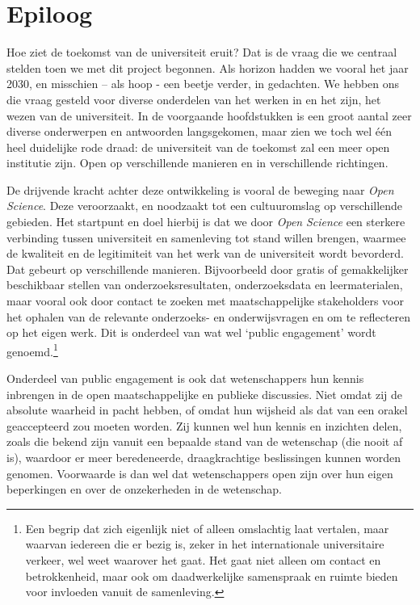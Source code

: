 \documentclass[smallauthor, chapterhaspagenum, nochapterinheader, pagenuminheader,  bigchapnum,medium2, tocpages, garamond, titleinheader]{jote-book}
\begin{document}
	\chapter*{Epiloog}

	\nochapterinheader



	Hoe ziet de toekomst van de universiteit eruit? Dat is de vraag die we centraal stelden toen we met dit project begonnen. Als horizon hadden we vooral het jaar 2030, en misschien -- als hoop - een beetje verder, in gedachten. We hebben ons die vraag gesteld voor diverse onderdelen van het werken in en het zijn, het wezen van de universiteit. In de voorgaande hoofdstukken is een groot aantal zeer diverse onderwerpen en antwoorden langsgekomen, maar zien we toch wel één heel duidelijke rode draad: de universiteit van de toekomst zal een meer open institutie zijn. Open op verschillende manieren en in verschillende richtingen.



	De drijvende kracht achter deze ontwikkeling is vooral de beweging naar \emph{Open }\emph{Science}. Deze veroorzaakt, en noodzaakt tot een cultuuromslag op verschillende gebieden. Het startpunt en doel hierbij is dat we door \emph{Open }\emph{Science} een sterkere verbinding tussen universiteit en samenleving tot stand willen brengen, waarmee de kwaliteit en de legitimiteit van het werk van de universiteit wordt bevorderd. Dat gebeurt op verschillende manieren. Bijvoorbeeld door gratis of gemakkelijker beschikbaar stellen van onderzoeksresultaten, onderzoeksdata en leermaterialen, maar vooral ook door contact te zoeken met maatschappelijke stakeholders voor het ophalen van de relevante onderzoeks- en onderwijsvragen en om te reflecteren op het eigen werk. Dit is onderdeel van wat wel ‘public engagement' wordt genoemd.\footnote{Een begrip dat zich eigenlijk niet of alleen omslachtig laat vertalen, maar waarvan iedereen die er bezig is, zeker in het internationale universitaire verkeer, wel weet waarover het gaat. Het gaat niet alleen om contact en betrokkenheid, maar ook om daadwerkelijke samenspraak en ruimte bieden voor invloeden vanuit de samenleving.}



	Onderdeel van public engagement is ook dat wetenschappers hun kennis inbrengen in de open maatschappelijke en publieke discussies. Niet omdat zij de absolute waarheid in pacht hebben, of omdat hun wijsheid als dat van een orakel geaccepteerd zou moeten worden. Zij kunnen wel hun kennis en inzichten delen, zoals die bekend zijn vanuit een bepaalde stand van de wetenschap (die nooit af is), waardoor er meer beredeneerde, draagkrachtige beslissingen kunnen worden genomen. Voorwaarde is dan wel dat wetenschappers open zijn over hun eigen beperkingen en over de onzekerheden in de wetenschap.
\end{document}
